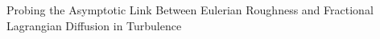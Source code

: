 \documentclass[]{article}
\begin{document}
Probing the Asymptotic Link Between Eulerian Roughness and Fractional Lagrangian Diffusion in Turbulence
\end{document}
